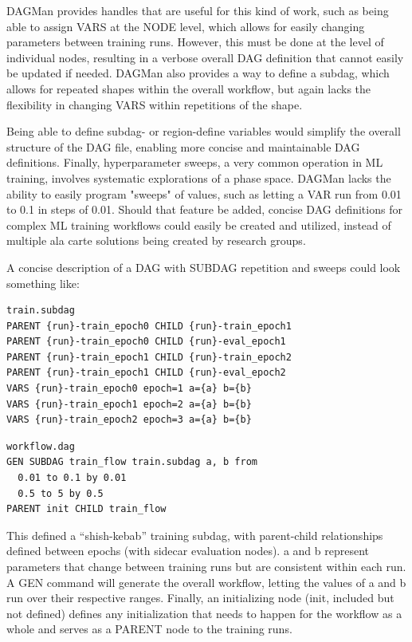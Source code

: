 \documentclass{article}
\begin{document}
DAGMan provides handles that are useful for this kind of work, such as being
able to assign VARS at the NODE level, which allows for easily changing parameters
between training runs. However, this must be done at the level of individual nodes, resulting
in a verbose overall DAG definition that cannot easily be updated if needed. DAGMan also
provides a way to define a subdag, which allows for repeated shapes within
the overall workflow, but again lacks the flexibility in changing VARS within repetitions
of the shape.

Being able to define subdag- or region-define variables would simplify the
overall structure of the DAG file, enabling more concise and maintainable DAG
definitions. Finally, hyperparameter sweeps, a very common operation in ML
training, involves systematic explorations of a phase space. DAGMan lacks the
ability to easily program "sweeps" of values, such as letting a VAR run from
0.01 to 0.1 in steps of 0.01. Should that feature be added, concise DAG definitions
for complex ML training workflows could easily be created and utilized, instead of
multiple ala carte solutions being created by research groups.

A concise description of a DAG with SUBDAG repetition and sweeps could look something like:

\begin{verbatim}
train.subdag
PARENT {run}-train_epoch0 CHILD {run}-train_epoch1
PARENT {run}-train_epoch0 CHILD {run}-eval_epoch1
PARENT {run}-train_epoch1 CHILD {run}-train_epoch2
PARENT {run}-train_epoch1 CHILD {run}-eval_epoch2
VARS {run}-train_epoch0 epoch=1 a={a} b={b}
VARS {run}-train_epoch1 epoch=2 a={a} b={b}
VARS {run}-train_epoch2 epoch=3 a={a} b={b}
\end{verbatim}


\begin{verbatim}
workflow.dag
GEN SUBDAG train_flow train.subdag a, b from
  0.01 to 0.1 by 0.01
  0.5 to 5 by 0.5
PARENT init CHILD train_flow
\end{verbatim}

This defined a ``shish-kebab'' training subdag, with parent-child relationships
defined between epochs (with sidecar evaluation nodes). a and b represent
parameters that change between training runs but are consistent within each run.
A GEN command will generate the overall workflow, letting the values of a and b
run over their respective ranges. Finally, an initializing node (init, included
but not defined) defines any initialization that needs to happen for the
workflow as a whole and serves as a PARENT node to the training runs.
\end{document}
